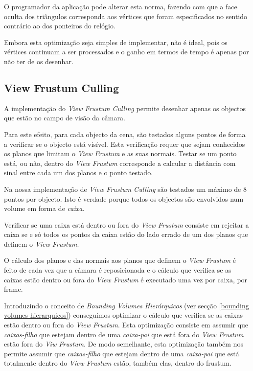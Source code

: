 \documentclass[a5paper,onecolumn, 11pt]{article}
\begin{document}
O programador da aplicação pode alterar esta norma, fazendo com que a face oculta dos triângulos corresponda aos vértices que foram especificados no sentido contrário ao dos ponteiros do relógio.

Embora esta optimização seja simples de implementar, não é ideal, pois os vértices continuam a ser processados e o ganho em termos de tempo é apenas por não ter de os desenhar.

\subsection{View Frustum Culling} \label{view frustum culling}
A implementação do \textit{View Frustum Culling} permite desenhar apenas os objectos que estão no campo de visão da câmara.

Para este efeito, para cada objecto da cena, são testados alguns pontos de forma a verificar se o objecto está visível. Esta verificação requer que sejam conhecidos os planos que limitam o \textit{View Frustum} e as suas normais. Testar se um ponto está, ou não, dentro do \textit{View Frustum} corresponde a calcular a distância com sinal entre cada um dos planos e o ponto testado.

Na nossa implementação de \textit{View Frustum Culling} são testados um máximo de 8 pontos por objecto. Isto é verdade porque todos os objectos são envolvidos num volume em forma de \textit{caixa}.

Verificar se uma caixa está dentro ou fora do \textit{View Frustum} consiste em rejeitar a caixa se e só todos os pontos da caixa estão do lado errado de um dos planos que definem o \textit{View Frustum}.

O cálculo dos planos e das normais aos planos que definem o \textit{View Frustum} é feito de cada vez que a câmara é reposicionada e o cálculo que verifica se as caixas estão dentro ou fora do \textit{View Frustum} é executado uma vez por caixa, por frame.

Introduzindo o conceito de \textit{Bounding Volumes Hierárquicos} (ver secção \ref{bounding volumes hierarquicos}) conseguimos optimizar o cálculo que verifica se as caixas estão dentro ou fora do \textit{View Frustum}. Esta optimização consiste em assumir que \textit{caixas-filho} que estejam dentro de uma \textit{caixa-pai} que está fora do \textit{View Frustum} estão fora do \textit{Viw Frustum}. De modo semelhante, esta optimização também nos permite assumir que \textit{caixas-filho} que estejam dentro de uma \textit{caixa-pai} que está totalmente dentro do \textit{View Frustum} estão, também elas, dentro do frustum.
\end{document}
